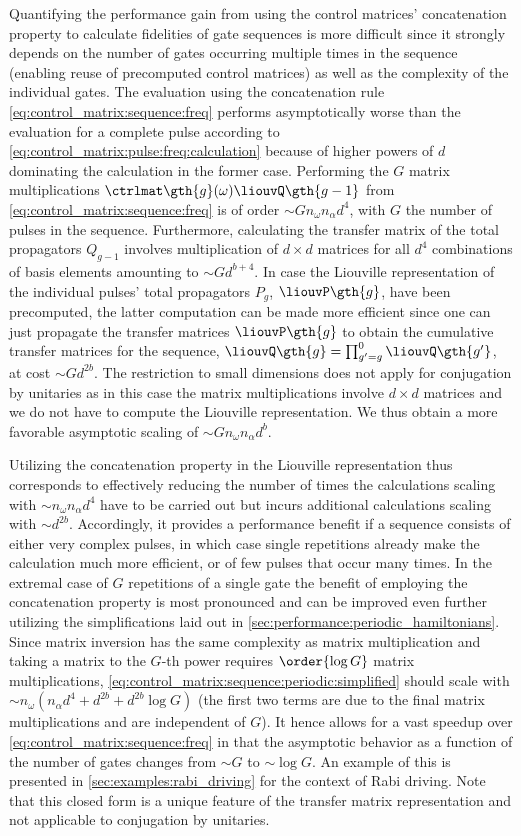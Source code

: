 Quantifying the performance gain from using the control matrices' concatenation property to calculate fidelities of gate sequences is more difficult since it strongly depends on the number of gates occurring multiple times in the sequence (enabling reuse of precomputed control matrices) as well as the complexity of the individual gates. The evaluation using the concatenation rule \cref{eq:control_matrix:sequence:freq} performs asymptotically worse than the evaluation for a complete pulse according to \cref{eq:control_matrix:pulse:freq:calculation} because of higher powers of $d$ dominating the calculation in the former case. Performing the $G$ matrix multiplications $\ctrlmat\gth{g}(\omega)\liouvQ\gth{g-1}$ from \cref{eq:control_matrix:sequence:freq} is of order $\sim G n_\omega n_\alpha d^4$, with $G$ the number of pulses in the sequence. Furthermore, calculating the transfer matrix of the total propagators $Q_{g-1}$ involves multiplication of $d\times d$ matrices for all $d^4$ combinations of basis elements amounting to $\sim G d^{b+4}$. In case the Liouville representation of the individual pulses' total propagators $P_g$, $\liouvP\gth{g}$, have been precomputed, the latter computation can be made more efficient since one can just propagate the transfer matrices $\liouvP\gth{g}$ to obtain the cumulative transfer matrices for the sequence, $\liouvQ\gth{g}=\prod_{g'=g}^0\liouvQ\gth{g'}$, at cost $\sim G d^{2b}$. The restriction to small dimensions does not apply for conjugation by unitaries as in this case the matrix multiplications involve $d\times d$ matrices and we do not have to compute the Liouville representation. We thus obtain a more favorable asymptotic scaling of $\sim G n_\omega n_\alpha d^b$.

Utilizing the concatenation property in the Liouville representation thus corresponds to effectively reducing the number of times the calculations scaling with $\sim n_\omega n_\alpha d^4$ have to be carried out but incurs additional calculations scaling with $\sim d^{2b}$. Accordingly, it provides a performance benefit if a sequence consists of either very complex pulses, in which case single repetitions already make the calculation much more efficient, or of few pulses that occur many times. In the extremal case of $G$ repetitions of a single gate the benefit of employing the concatenation property is most pronounced and can be improved even further utilizing the simplifications laid out in \cref{sec:performance:periodic_hamiltonians}. Since matrix inversion has the same complexity as matrix multiplication and taking a matrix to the $G$-th power requires $\order{\log G}$ matrix multiplications, \cref{eq:control_matrix:sequence:periodic:simplified} should scale with $\sim n_\omega (n_\alpha d^4 + d^{2b} + d^{2b}\log{G})$ (the first two terms are due to the final matrix multiplications and are independent of $G$). It hence allows for a vast speedup over \cref{eq:control_matrix:sequence:freq} in that the asymptotic behavior as a function of the number of gates changes from $\sim G$ to $\sim\log G$. An example of this is presented in \cref{sec:examples:rabi_driving} for the context of Rabi driving. Note that this closed form is a unique feature of the transfer matrix representation and not applicable to conjugation by unitaries.

